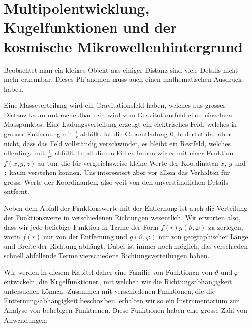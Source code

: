 %
%
%
\chapter{Multipolentwicklung, Kugelfunktionen und der
kosmische Mikrowellenhintergrund
\label{skript:chapter:multipol}}
\rhead{}
Beobachtet man ein kleines Objekt aus einiger Distanz sind viele
Details nicht mehr erkennbar.
Dieses Ph"anomen muss auch einen mathematischen Ausdruck haben.

Eine Masseverteilung wird ein Gravitationsfeld haben, welches aus
grosser Distanz kaum unterscheidbar sein wird vom Gravitationsfeld
eines einzelnen Masspunktes.
Eine Ladungsverteilung erzeugt ein elektrisches Feld, welches in
grosser Entfernung mit $\frac1r$ abfällt.
Ist die Gesamtladung $0$, bedeutet das aber nicht, dass das
Feld vollständig verschwindet, es bleibt ein Restfeld, welches
allerdings mit $\frac1{r^2}$ abfällt.
In all diesen Fällen haben wir es mit einer Funktion $f(x,y,z)$ zu tun,
die für vergleichsweise kleine Werte der Koordinaten $x$, $y$ und $z$
kaum verstehen können.
Uns interessiert aber vor allem das Verhalten für grosse Werte der
Koordinanten, also weit von den unverständlichen Details entfernt.

Neben dem Abfall der Funktionswerte mit der Entfernung ist auch
die Verteilung der Funktionswerte in verschiedenen Richtungen wesentlich.
Wir erwarten also, dass wir jede beliebige Funktion in Terme der Form
$
f(r) g(\vartheta,\varphi)
$
zu zerlegen, worin $f(r)$ nur von der Entfernung und $g(\vartheta,\varphi)$
nur von geographischer Länge und Breite der Richtung abhängt.
Dabei ist immer noch möglich, das verschieden schnell abfallende
Terme vierschiedene Richtungsverteilungen haben.

Wir werden in diesem Kapitel daher eine Familie von Funktionen
von $\vartheta$ und $\varphi$ entwickeln, die Kugelfunktionen,
mit welchen wir die Richtungsabhängigkeit untersuchen können.
Zusammen mit verschiedenen Funktionen, die die Entfernungsabhängigkeit
beschreiben, erhalten wir so ein Instrumentarium zur Analyse von
beliebigen Funktionen.
Diese Funktionen haben eine grosse Zahl von Anwendungen:


